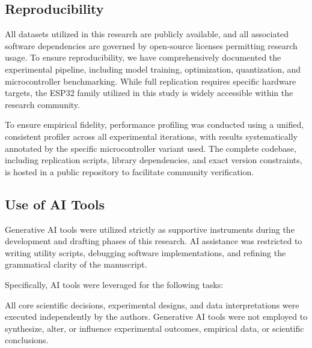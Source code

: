 \subsection{Reproducibility}

All datasets utilized in this research are publicly available, and all associated software dependencies are governed by open-source licenses permitting research usage. To ensure reproducibility, we have comprehensively documented the experimental pipeline, including model training, optimization, quantization, and microcontroller benchmarking. While full replication requires specific hardware targets, the ESP32 family utilized in this study is widely accessible within the research community.

To ensure empirical fidelity, performance profiling was conducted using a unified, consistent profiler across all experimental iterations, with results systematically annotated by the specific microcontroller variant used. The complete codebase, including replication scripts, library dependencies, and exact version constraints, is hosted in a public repository to facilitate community verification.

\subsection{Use of AI Tools}

Generative AI tools were utilized strictly as supportive instruments during the development and drafting phases of this research. AI assistance was restricted to writing utility scripts, debugging software implementations, and refining the grammatical clarity of the manuscript.

Specifically, AI tools were leveraged for the following tasks:

All core scientific decisions, experimental designs, and data interpretations were executed independently by the authors. Generative AI tools were not employed to synthesize, alter, or influence experimental outcomes, empirical data, or scientific conclusions.